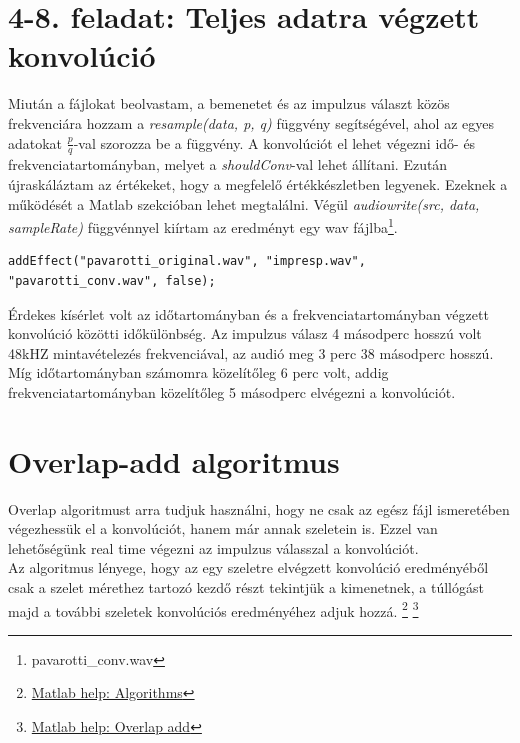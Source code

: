 \documentclass{article}
\begin{document}
\section*{4-8. feladat: Teljes adatra végzett konvolúció}
	Miután a fájlokat beolvastam, a bemenetet és az impulzus választ közös frekvenciára hozzam a \textit{resample(data, p, q)} függvény segítségével, ahol az egyes adatokat $\frac{p}{q}$-val szorozza be a függvény. A konvolúciót el lehet végezni idő- és frekvenciatartományban, melyet a \textit{shouldConv}-val lehet állítani. Ezután újraskáláztam az értékeket, hogy a megfelelő értékkészletben legyenek. Ezeknek a működését a Matlab szekcióban lehet megtalálni. Végül \textit{audiowrite(src, data, sampleRate)} függvénnyel kiírtam az eredményt egy wav fájlba\footnote{pavarotti\_conv.wav}.
	\begin{lstlisting}
addEffect("pavarotti_original.wav", "impresp.wav", "pavarotti_conv.wav", false);
	\end{lstlisting}
	
	Érdekes kísérlet volt az időtartományban és a frekvenciatartományban végzett konvolúció közötti időkülönbség. Az impulzus válasz 4 másodperc hosszú volt 48kHZ mintavételezés frekvenciával, az audió meg 3 perc 38 másodperc hosszú. Míg időtartományban számomra közelítőleg 6 perc volt, addig frekvenciatartományban közelítőleg 5 másodperc elvégezni a konvolúciót.

\section*{Overlap-add algoritmus}
	Overlap algoritmust arra tudjuk használni, hogy ne csak az egész fájl ismeretében végezhessük el a konvolúciót, hanem már annak szeletein is. Ezzel van lehetőségünk real time végezni az impulzus válasszal a konvolúciót. \\
	Az algoritmus lényege, hogy az egy szeletre elvégzett konvolúció eredményéből csak a szelet mérethez tartozó kezdő részt tekintjük a kimenetnek, a túllógást majd a további szeletek konvolúciós eredményéhez adjuk hozzá.
	\footnote{\href{https://www.mathworks.com/help/signal/ref/fftfilt.html\#mw_80e5adbd-8d4e-43f8-b26b-b417d8b80465}{Matlab help: Algorithms}}
	\footnote{\href{https://www.mathworks.com/help/dsp/ug/overlap-add-save.html}{Matlab help: Overlap add}}
\end{document}
